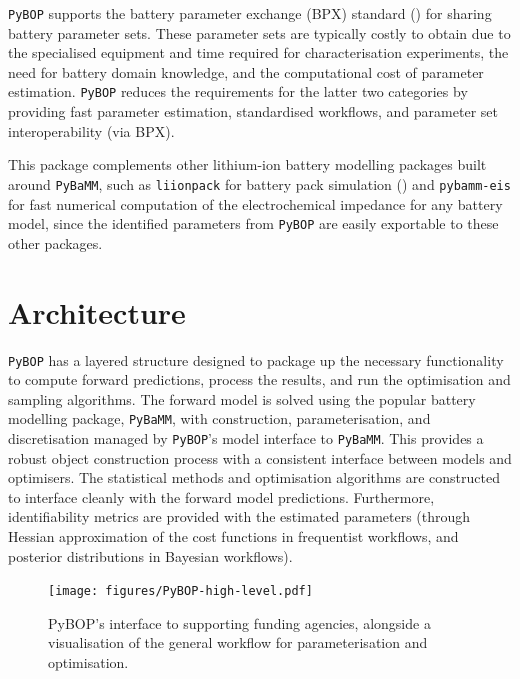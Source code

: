 \documentclass[
]{article}
\begin{document}
\texttt{PyBOP} supports the battery parameter exchange (BPX) standard
() for sharing battery
parameter sets. These parameter sets are typically costly to obtain due
to the specialised equipment and time required for characterisation
experiments, the need for battery domain knowledge, and the
computational cost of parameter estimation. \texttt{PyBOP} reduces the
requirements for the latter two categories by providing fast parameter
estimation, standardised workflows, and parameter set interoperability
(via BPX).

This package complements other lithium-ion battery modelling packages
built around \texttt{PyBaMM}, such as \texttt{liionpack} for battery
pack simulation () and
\texttt{pybamm-eis} for fast numerical computation of the
electrochemical impedance for any battery model, since the identified
parameters from \texttt{PyBOP} are easily exportable to these other
packages.

\section{Architecture}\label{architecture}

\texttt{PyBOP} has a layered structure designed to package up the
necessary functionality to compute forward predictions, process the
results, and run the optimisation and sampling algorithms. The forward
model is solved using the popular battery modelling package,
\texttt{PyBaMM}, with construction, parameterisation, and discretisation
managed by \texttt{PyBOP}'s model interface to \texttt{PyBaMM}. This
provides a robust object construction process with a consistent
interface between models and optimisers. The statistical methods and
optimisation algorithms are constructed to interface cleanly with the
forward model predictions. Furthermore, identifiability metrics are
provided with the estimated parameters (through Hessian approximation of
the cost functions in frequentist workflows, and posterior distributions
in Bayesian workflows).

\begin{figure}
\centering
\texttt{[image: figures/PyBOP-high-level.pdf]}
\caption{PyBOP's interface to supporting funding agencies, alongside a
visualisation of the general workflow for parameterisation and
optimisation. \label{fig:high-level}}
\end{figure}
\end{document}
